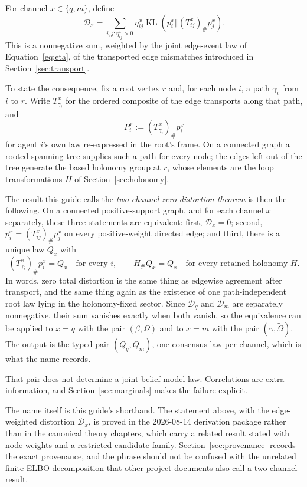 \documentclass[11pt,letterpaper]{article}
\newcommand{\KL}{\operatorname{KL}}
\begin{document}
For channel \(x\in\{q,m\}\), define
\begin{equation}
  \mathcal D_x
  =
  \sum_{i,j:\eta_{ij}^x>0}
  \eta_{ij}^x
  \KL\left(
  p_i^x\Vert(T_{ij}^x)_{\#}p_j^x
  \right).
  \label{eq:distortion}
\end{equation}
This is a nonnegative sum, weighted by the joint edge-event law of Equation~\eqref{eq:eta}, of the transported edge mismatches introduced in Section~\ref{sec:transport}.

To state the consequence, fix a root vertex \(r\) and, for each node \(i\), a path \(\gamma_i\) from \(i\) to \(r\). Write \(T_{\gamma_i}^x\) for the ordered composite of the edge transports along that path, and
\[
  P_i^x:=(T_{\gamma_i}^x)_{\#}p_i^x
\]
for agent \(i\)'s own law re-expressed in the root's frame. On a connected graph a rooted spanning tree supplies such a path for every node; the edges left out of the tree generate the based holonomy group at \(r\), whose elements are the loop transformations \(H\) of Section~\ref{sec:holonomy}.

The result this guide calls the \emph{two-channel zero-distortion theorem} is then the following. On a connected positive-support graph, and for each channel \(x\) separately, these three statements are equivalent: first, \(\mathcal D_x=0\); second, \(p_i^x=(T_{ij}^x)_{\#}p_j^x\) on every positive-weight directed edge; and third, there is a unique law \(Q_x\) with
\begin{equation}
  (T_{\gamma_i}^x)_{\#}p_i^x=Q_x
  \quad\text{for every }i,
  \qquad
  H_{\#}Q_x=Q_x
  \quad\text{for every retained holonomy }H.
  \label{eq:root-law}
\end{equation}
In words, zero total distortion is the same thing as edgewise agreement after transport, and the same thing again as the existence of one path-independent root law lying in the holonomy-fixed sector. Since \(\mathcal D_q\) and \(\mathcal D_m\) are separately nonnegative, their sum vanishes exactly when both vanish, so the equivalence can be applied to \(x=q\) with the pair \((\beta,\Omega)\) and to \(x=m\) with the pair \((\gamma,\widetilde\Omega)\). The output is the typed pair \((Q_q,Q_m)\), one consensus law per channel, which is what the name records.

That pair does not determine a joint belief-model law. Correlations are extra information, and Section~\ref{sec:marginals} makes the failure explicit.

The name itself is this guide's shorthand. The statement above, with the edge-weighted distortion \(\mathcal D_x\), is proved in the 2026-08-14 derivation package rather than in the canonical theory chapters, which carry a related result stated with node weights and a restricted candidate family. Section~\ref{sec:provenance} records the exact provenance, and the phrase should not be confused with the unrelated finite-ELBO decomposition that other project documents also call a two-channel result.
\end{document}
